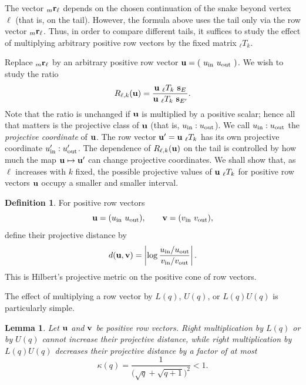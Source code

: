 \documentclass[12pt]{article}
\theoremstyle{plain}
\newtheorem{lemma}[theorem]{Lemma}
\theoremstyle{definition}
\newtheorem{definition}[theorem]{Definition}
\theoremstyle{remark}
\begin{document}
The vector ${}_m{\bf r}_{\ell}$ depends on the chosen continuation
of the snake beyond vertex $\ell$ (that is, on the tail).
However, the formula above uses the tail only via
the row vector ${}_m{\bf r}_{\ell}$.
Thus, in order to compare different tails,
it suffices to study the effect of multiplying arbitrary positive
row vectors by the fixed matrix ${}_{\ell}T_k$.

Replace ${}_m{\bf r}_{\ell}$ by an arbitrary positive row vector
${\bf u} = ( \ u_{\rm in} \ u_{\rm out} \ )$.
We wish to study the ratio
\[ R_{\ell,k}({\bf u}) =
\frac{ {\bf u}\ {}_{\ell}T_k\ {\bf s}_E }
{ {\bf u}\ {}_{\ell}T_k\ {\bf s}_{E'} }.  \]
Note that the ratio is unchanged if \({\bf u}\) is multiplied by 
a positive scalar; hence all that matters is the projective class 
of \({\bf u}\) (that is, $u_{\rm in} : u_{\rm out}$).
We call $u_{\rm in} : u_{\rm out}$
the {\em projective coordinate} of $\bf u$.
The row vector
${\bf u}' = {\bf u}\ {}_{\ell}T_k$ has its own projective coordinate
$u'_{\rm in} : u'_{\rm out}$.  The dependence of
\(R_{\ell,k}({\bf u})\) on the tail is controlled by 
how much the map ${\bf u}\mapsto {\bf u}'$
can change projective coordinates.
We shall show that, as \(\ell\) increases with \(k\) fixed, the possible
projective values of \( {\bf u}\ {}_{\ell}T_k \)
for positive row vectors \({\bf u}\) occupy a smaller and smaller interval.

\begin{definition}
For positive row vectors \[ {\bf u} =
(u_{\rm in}\ u_{\rm out}), \qquad {\bf v}=(v_{\rm in}\ v_{\rm out}), \]
define their projective distance by
\[ d({\bf u},{\bf v}) = 
\left| \log\frac{u_{\rm in}/u_{\rm out}} {v_{\rm in}/v_{\rm out}} \right|. \]
This is Hilbert's projective metric on the positive cone of row vectors.
\end{definition}

The effect of multiplying a row vector by $L(q)$, $U(q)$, or
$L(q)U(q)$ is particularly simple.

\begin{lemma}
Let ${\bf u}$ and ${\bf v}$ be positive row vectors.  Right multiplication
by $L(q)$ or by $U(q)$ cannot increase their projective distance, while
right multiplication by $L(q)U(q)$ decreases their projective distance by
a factor of at most
\[ \kappa(q)=\frac{1}{\bigl(\sqrt q+\sqrt{q+1}\bigr)^2}<1 .  \]
\end{lemma}
\end{document}
